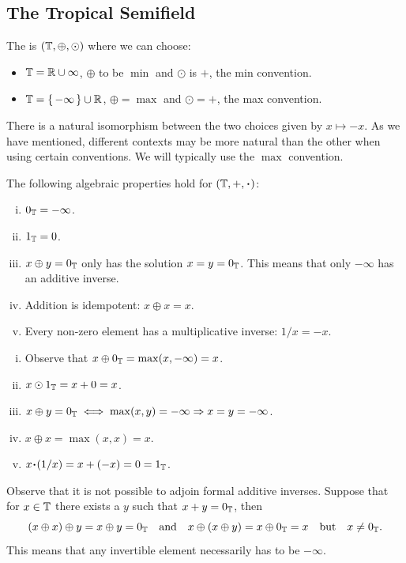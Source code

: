 \documentclass[12pt]{memoir}
\theoremstyle{definition}
\begin{document}
\subsection{The Tropical Semifield}

\begin{Def}
    The  is $(\mathbb{T},\oplus,\odot)$ where we can choose:
    \begin{itemize}
        \item $\mathbb{T}=\mathbb{R}\cup\infty$, $\oplus$ to be $\min$ and $\odot$ is $+$, the min convention.
        \item $\mathbb{T}=\{\,-\infty\,\}\cup\mathbb{R}$, $\oplus=\max$ and $\odot=+$, the max convention.
    \end{itemize}
\end{Def}

There is a natural isomorphism between the two choices given by $x\mapsto -x$. As we have mentioned, different contexts may be more natural than the other when using certain conventions. We will typically use the $\max$ convention. 

\begin{Prop}
The following algebraic properties hold for $(\bT,+,\.)$:
\begin{enumerate}[i)]
    \itemsep=-0.4em
    \item $0_{\mathbb{T}}=-\infty$.
    \item $1_{\mathbb{T}}=0$.
    \item $x\oplus y=0_{\mathbb{T}}$ only has the solution $x=y=0_{\mathbb{T}}$. This means that only $-\infty$ has an additive inverse.
    \item Addition is idempotent: $x\oplus x=x$.
    \item Every non-zero element has a multiplicative inverse: $1/x=-x$.
\end{enumerate}
\end{Prop}

\begin{ptcbp}
    \begin{enumerate}[i)]
        \itemsep=-0.4em
    \item Observe that $x\oplus0_{\mathbb{T}}=\max(x,-\infty)=x$.
    \item $x\odot 1_{\mathbb{T}}=x+0=x$.
    \item $x\oplus y=0_{\mathbb{T}}\iff \max(x,y)=-\infty\Rightarrow x=y=-\infty$.
    \item $x\oplus x=\max(x,x)=x$.
    \item $x\.(1/x)=x+(-x)=0=1_\bT$.
\end{enumerate}
\end{ptcbp}
Observe that it is not possible to adjoin formal additive inverses. Suppose that for $x\in\mathbb{T}$ there exists a $y$ such that $x+y=0_{\mathbb{T}}$, then 
$$(x\oplus x)\oplus y=x\oplus y=0_{\mathbb{T}}\quad\text{and}\quad x\oplus (x\oplus y)=x\oplus 0_{\mathbb{T}}=x\quad\text{but}\quad x\neq 0_{\mathbb{T}}.$$
This means that any invertible element necessarily has to be $-\infty$.
\end{document}
